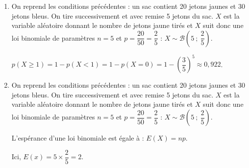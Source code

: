 \begin{enumerate}
Il s'agit là d'un schéma de Bernoulli : la répétition de 5 expériences aléatoires n'ayant que deux issues, identiques et indépendantes entre elles. Si on note par $X$ la variable aléatoire donnant le nombre de jetons jaune tirés, alors $X$ suit donc une loi binomiale de paramètres $n = 5$ et $p = \dfrac{20}{50}=\dfrac25$ : $X \sim \mathcal{B}\left(5~;~\dfrac25\right)$

Ainsi $p(X=2)=\dbinom{5}{2}\times \left(\dfrac25\right)^2 \times \left(1-\dfrac25\right)^{5-2}=0,3456\approx 0,346$.

\hfill {}
\item On reprend les conditions précédentes : un sac contient 20 jetons jaunes et 30 jetons bleus. On tire successivement et avec remise 5 jetons du sac. $X$ est la variable aléatoire donnant le nombre de jetons jaune tirés et $X$ suit donc une loi binomiale de paramètres $n=5$ et $p=\dfrac{20}{50}=\dfrac25$ : $X \sim \mathcal{B}\left(5~;~\dfrac25\right)$.

$p(X\geqslant 1)=1-p(X<1)=1-p(X=0)=1-\left(\dfrac35\right)^5\approx0,922$.

\hfill {}
	\item On reprend les conditions précédentes : un sac contient 20 jetons jaunes et 30 jetons bleus. On tire successivement et avec remise 5 jetons du sac. $X$ est la variable aléatoire donnant le nombre de jetons jaune tirés et $X$ suit donc une loi binomiale de paramètres $n=5$ et $p=\dfrac{20}{50}=\dfrac25$ : $X \sim \mathcal{B}\left(5~;~\dfrac25\right)$.

L'espérance d'une loi binomiale est égale à : $E(X) = np$.

Ici, $E(x)=5\times \dfrac25=2$.

\hfill {}
\end{enumerate}
